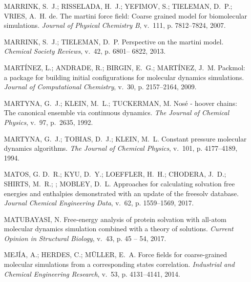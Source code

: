 \documentclass[
	12pt,				%
	openany,			%
	oneside,			%
	a4paper,			%
	english,			%
	brazil				%
	]{abntex2}
\begin{document}
\begin{thebibliography}{}
{MARRINK, S.~J.; RISSELADA, H.~J.; YEFIMOV, S.; TIELEMAN, D.~P.; VRIES, A.~H.
  de. The martini force field: Coarse grained model for biomolecular
  simulations.
\emph{Journal of Physical Chemistry B}, v.~111, p. 7812–7824, 2007.}

{MARRINK, S.~J.; TIELEMAN, D.~P. Perspective on the martini model.
\emph{Chemical Society Reviews}, v.~42, p. 6801– 6822, 2013.}

{MART\'INEZ, L.; ANDRADE, R.; BIRGIN, E.~G.; MART\'INEZ, J.~M. Packmol: a
  package for building initial configurations for molecular dynamics
  simulations.
\emph{Journal of Computational Chemistry}, v.~30, p. 2157--2164, 2009.}

{MARTYNA, G.~J.; KLEIN, M.~L.; TUCKERMAN, M. Nos\'e - hoover chains: The
  canonical ensemble via continuous dynamics.
\emph{The Journal of Chemical Physics}, v.~97, p.~2635, 1992.}

{MARTYNA, G.~J.; TOBIAS, D.~J.; KLEIN, M.~L. Constant pressure molecular
  dynamics algorithms.
\emph{The Journal of Chemical Physics}, v.~101, p. 4177--4189, 1994.}

{MATOS, G. D.~R.; KYU, D.~Y.; LOEFFLER, H.~H.; CHODERA, J.~D.; SHIRTS, M.~R.; ;
  MOBLEY, D.~L. Approaches for calculating solvation free energies and
  enthalpies demonstrated with an update of the freesolv database.
\emph{Journal Chemical Engineering Data}, v.~62, p. 1559--1569, 2017.}

{MATUBAYASI, N. Free-energy analysis of protein solvation with all-atom
  molecular dynamics simulation combined with a theory of solutions.
\emph{Current Opinion in Structural Biology}, v.~43, p. 45 -- 54, 2017.}

{MEJ\'IA, A.; HERDES, C.; M\"ULLER, E.~A. Force fields for coarse-grained
  molecular simulations from a corresponding states correlation.
\emph{Industrial and Chemical Engineering Research}, v.~53, p. 4131–4141,
  2014.}


\end{thebibliography}
\end{document}
